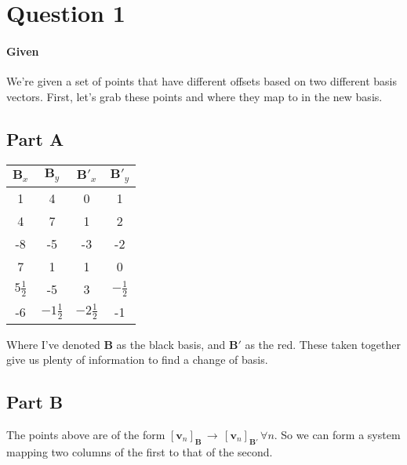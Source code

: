 \documentclass{article}
\begin{document}
    \section{Question 1}
        \paragraph{Given}
            We're given a set of points that have different offsets
            based on two different basis vectors. First, let's grab
            these points and where they map to in the new basis.
        \subsection{Part A}
            \begin{center}
                \Large
            \begin{tabular}{c c c c}
                $\mathbf{B}_x$ & $\mathbf{B}_y$ & $\mathbf{B}'_x$ & $\mathbf{B}'_y$ \\
                \hline
                1 & 4 & 0 & 1\\
                4 & 7 & 1 & 2\\
                -8 & -5 & -3 & -2\\
                7 & 1 & 1 & 0\\
                $5\frac{1}{2}$ & -5 & 3 & $-\frac{1}{2}$\\
                -6 & $-1\frac{1}{2}$ & $-2\frac{1}{2}$ & -1
            \end{tabular}
            \end{center}
            Where I've denoted $\mathbf{B}$ as the black basis, and $\mathbf{B}'$ as the red.
            These taken together give us plenty of information to find a change of basis.
        \subsection{Part B}
            The points above are of the form $[\mathbf{v}_n]_{\mathbf{B}}\, \rightarrow \,[\mathbf{v}_n]_{\mathbf{B}'}\, \forall{n}$.
            So we can form a system mapping two columns of the first to that of the second.
\end{document}
